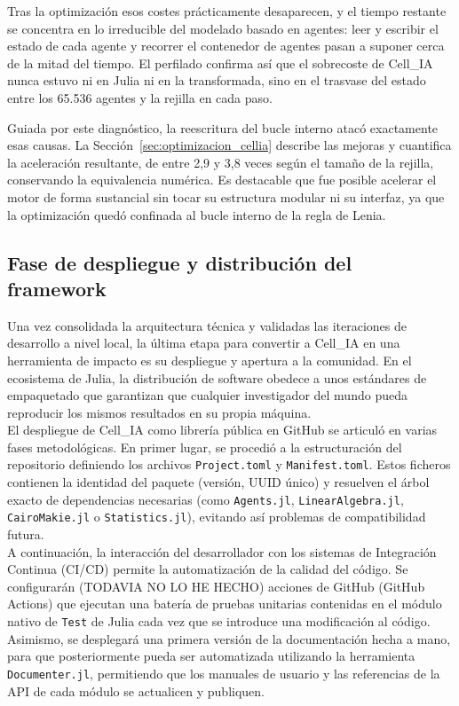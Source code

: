 \documentclass[runningheads]{llncs}
\begin{document}
Tras la optimización esos costes prácticamente desaparecen, y el tiempo restante se concentra en lo irreducible del modelado basado en agentes: leer y escribir el estado de cada agente y recorrer el contenedor de agentes pasan a suponer cerca de la mitad del tiempo. El perfilado confirma así que el sobrecoste de Cell\_IA nunca estuvo ni en Julia ni en la transformada, sino en el trasvase del estado entre los 65.536 agentes y la rejilla en cada paso.

Guiada por este diagnóstico, la reescritura del bucle interno atacó exactamente esas causas. La Sección~\ref{sec:optimizacion_cellia} describe las mejoras y cuantifica la aceleración resultante, de entre 2,9 y 3,8 veces según el tamaño de la rejilla, conservando la equivalencia numérica. Es destacable que fue posible acelerar el motor de forma sustancial sin tocar su estructura modular ni su interfaz, ya que la optimización quedó confinada al bucle interno de la regla de Lenia.

\subsection{Fase de despliegue y distribución del framework}
Una vez consolidada la arquitectura técnica y validadas las iteraciones de desarrollo a nivel local, la última etapa para convertir a Cell\_IA en una herramienta de impacto es su despliegue y apertura a la comunidad. En el ecosistema de Julia, la distribución de software obedece a unos estándares de empaquetado que garantizan que cualquier investigador del mundo pueda reproducir los mismos resultados en su propia máquina.\\

El despliegue de Cell\_IA como librería pública en GitHub se articuló en varias fases metodológicas. En primer lugar, se procedió a la estructuración del repositorio definiendo los archivos \texttt{Project.toml} y \texttt{Manifest.toml}. Estos ficheros contienen la identidad del paquete (versión, UUID único) y resuelven el árbol exacto de dependencias necesarias (como \texttt{Agents.jl}, \texttt{LinearAlgebra.jl}, \texttt{CairoMakie.jl} o \texttt{Statistics.jl}), evitando así problemas de compatibilidad futura.\\

A continuación, la interacción del desarrollador con los sistemas de Integración Continua (CI/CD) permite la automatización de la calidad del código. Se configurarán (TODAVIA NO LO HE HECHO) acciones de GitHub (GitHub Actions) que ejecutan una batería de pruebas unitarias contenidas en el módulo nativo de \texttt{Test} de Julia cada vez que se introduce una modificación al código. Asimismo, se desplegará una primera versión de la documentación hecha a mano, para que posteriormente pueda ser automatizada utilizando la herramienta \texttt{Documenter.jl}, permitiendo que los manuales de usuario y las referencias de la API de cada módulo se actualicen y publiquen.\\
\end{document}
